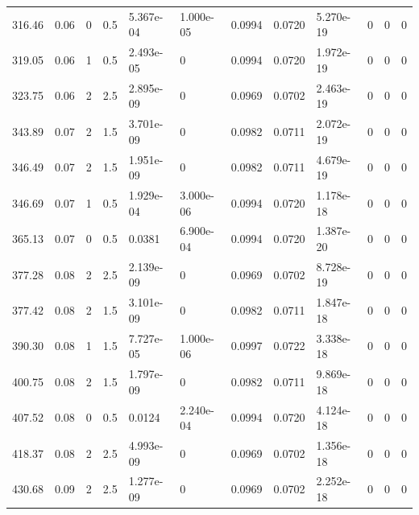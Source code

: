\documentclass[preview]{standalone}
\begin{document}
{{\begin{tabular}{L{1.2cm}C{1.2cm} C{0.3cm}C{0.5cm} C{1.4cm}C{1.4cm} C{1.4cm}C{1.4cm} C{1.6cm}C{1.6cm} C{1.6cm}C{1.6cm}}
  316.46  &  0.06  & 0     & 0.5 &  5.367e-04  & 1.000e-05  &  0.0994&   0.0720& 5.270e-19 & 0   &  0 & 0  \\ 
  319.05  &  0.06  & 1     & 0.5 &  2.493e-05  & 0  &  0.0994&   0.0720& 1.972e-19 & 0   &  0 & 0  \\ 
  323.75  &  0.06  & 2     & 2.5 &  2.895e-09  & 0  &  0.0969&   0.0702& 2.463e-19 & 0   &  0 & 0  \\ 
  343.89  &  0.07  & 2     & 1.5 &  3.701e-09  & 0  &  0.0982&   0.0711& 2.072e-19 & 0   &  0 & 0  \\ 
  346.49  &  0.07  & 2     & 1.5 &  1.951e-09  & 0  &  0.0982&   0.0711& 4.679e-19 & 0   &  0 & 0  \\ 
  346.69  &  0.07  & 1     & 0.5 &  1.929e-04  & 3.000e-06  &  0.0994&   0.0720& 1.178e-18 & 0   &  0 & 0  \\ 
  365.13  &  0.07  & 0     & 0.5 &  0.0381  & 6.900e-04  &  0.0994&   0.0720& 1.387e-20 & 0   &  0 & 0  \\ 
  377.28  &  0.08  & 2     & 2.5 &  2.139e-09  & 0  &  0.0969&   0.0702& 8.728e-19 & 0   &  0 & 0  \\ 
  377.42  &  0.08  & 2     & 1.5 &  3.101e-09  & 0  &  0.0982&   0.0711& 1.847e-18 & 0   &  0 & 0  \\ 
  390.30  &  0.08  & 1     & 1.5 &  7.727e-05  & 1.000e-06  &  0.0997&   0.0722& 3.338e-18 & 0   &  0 & 0  \\ 
  400.75  &  0.08  & 2     & 1.5 &  1.797e-09  & 0  &  0.0982&   0.0711& 9.869e-18 & 0   &  0 & 0  \\ 
  407.52  &  0.08  & 0     & 0.5 &  0.0124  & 2.240e-04  &  0.0994&   0.0720& 4.124e-18 & 0   &  0 & 0  \\ 
  418.37  &  0.08  & 2     & 2.5 &  4.993e-09  & 0  &  0.0969&   0.0702& 1.356e-18 & 0   &  0 & 0  \\ 
  430.68  &  0.09  & 2     & 2.5 &  1.277e-09  & 0  &  0.0969&   0.0702& 2.252e-18 & 0   &  0 & 0  \\ 
\hline 
\end{tabular} 

}}
\end{document}
